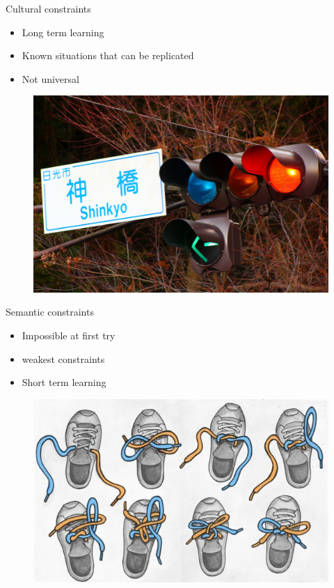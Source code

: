 \documentclass{beamer}
\begin{document}
\begin{frame}{Cultural constraints}
    \begin{itemize}
		\item Long term learning
    		\item Known situations that can be replicated
    		\item Not universal
    \end{itemize}
    \begin{figure}[ht]
    \includegraphics[scale=0.1]{japan-traffic-light.jpg}
    \end{figure}
\end{frame}

\begin{frame}{Semantic constraints}
    \begin{itemize}
    \item Impossible at first try
    \item weakest constraints
    \item Short term learning
    \end{itemize}
    \begin{figure}
    \includegraphics[scale=0.4]{tie_your_shoes.jpg}
    \end{figure}
\end{frame}
\end{document}
